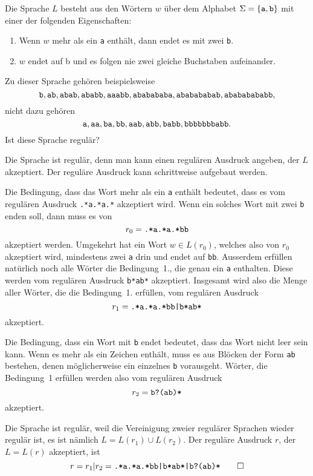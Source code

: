 Die Sprache $L$ besteht aus den Wörtern $w$ über dem Alphabet
$\Sigma=\{\text{\tt a},\text{\tt b}\}$ mit einer der folgenden Eigenschaften:
\begin{enumerate}
\item Wenn $w$ mehr als ein {\tt a} enthält, dann endet es mit zwei {\tt b}.
\item $w$ endet auf {\text b} und es folgen nie zwei gleiche
Buchstaben aufeinander.
\end{enumerate}
Zu dieser Sprache gehören beispielsweise
\[
\text{\tt b},
\text{\tt ab},
\text{\tt abab},
\text{\tt ababb},
\text{\tt aaabb},
\text{\tt ababababa},
\text{\tt ababababab},
\text{\tt abababababb},
\]
nicht dazu gehören
\[
\text{\tt a},
\text{\tt aa},
\text{\tt ba},
\text{\tt bb},
\text{\tt aab},
\text{\tt abb},
\text{\tt babb},
\text{\tt bbbbbbbabb}.
\]
Ist diese Sprache regulär?

\begin{loesung}
Die Sprache ist regulär, denn man kann einen regulären Ausdruck
angeben, der $L$ akzeptiert. Der reguläre Ausdruck kann schrittweise
aufgebaut werden.

Die Bedingung, dass das Wort mehr als ein {\tt a} enthält bedeutet,
dass es vom regulären Ausdruck {\tt .*a.*a.*} akzeptiert wird. Wenn
ein solches Wort mit zwei {\tt b} enden soll, dann muss es von
\[
r_0=\text{\tt .*a.*a.*bb}
\]
akzeptiert werden.
Umgekehrt hat ein Wort $w\in L(r_0)$, welches also von $r_0$ akzeptiert
wird, mindestens zwei {\tt a} drin und endet auf {\tt bb}.
Ausserdem erfüllen natürlich noch alle Wörter
die Bedingung~1., die genau ein {\tt a} enthalten. Diese werden
vom regulären Ausdruck {\tt b*ab*} akzeptiert. Insgesamt wird also die
Menge aller Wörter, die die Bedingung~1. erfüllen, vom regulären
Ausdruck
\[
r_1=\text{\tt .*a.*a.*bb|b*ab*}
\]
akzeptiert.

Die Bedingung, dass ein Wort mit {\tt b} endet bedeutet, dass das Wort
nicht leer sein kann. Wenn es mehr als ein Zeichen enthält, muss es
aus Blöcken der Form {\tt ab} bestehen, denen möglicherweise ein
einzelnes {\tt b} vorausgeht. Wörter, die Bedingung~1 erfüllen werden
also vom regulären Ausdruck
\[
r_2=\text{\tt b?(ab)*}
\]
akzeptiert.

Die Sprache ist regulär, weil die Vereinigung zweier regulärer Sprachen
wieder regulär ist, es ist nämlich $L=L(r_1)\cup L(r_2)$. Der reguläre
Ausdruck $r$, der $L=L(r)$ akzeptiert, ist
\[
r=r_1|r_2 =
\text{\tt .*a.*a.*bb|b*ab*|b?(ab)*}
\qedhere
\]
\end{loesung}
